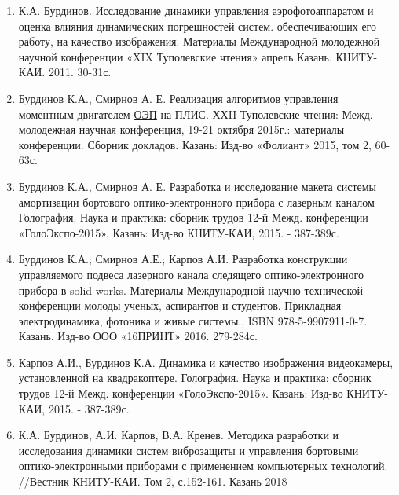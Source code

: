 \begin{enumerate}
  \item К.А. Бурдинов. Исследование динамики управления аэрофотоаппаратом и оценка влияния динамических погрешностей систем. обеспечивающих его работу, на качество изображения. Материалы Международной молодежной научной конференции «XIX Туполевские чтения» апрель Казань. КНИТУ- КАИ. 2011. 30-31с.
  \item Бурдинов К.А., Смирнов А. Е. Реализация алгоритмов управления моментным двигателем  \hyperref[acroEOS]{ОЭП} на ПЛИС. ХХII Туполевские чтения: Межд. молодежная научная конференция, 19-21 октября 2015г.: материалы конференции. Сборник докладов. Казань: Изд-во «Фолиант» 2015, том 2, 60-63с.
  \item Бурдинов К.А., Смирнов А. Е. Разработка и исследование макета системы амортизации бортового оптико-электронного прибора с лазерным каналом Голография. Наука и практика: сборник трудов 12-й Межд. конференции «ГолоЭкспо-2015». Казань: Изд-во КНИТУ-КАИ, 2015. - 387-389с.
  \item Бурдинов К.А.; Смирнов А.Е.; Карпов А.И. Разработка конструкции управляемого подвеса лазерного канала следящего оптико-электронного прибора в solid works. Материалы Международной научно-технической конференции молоды ученых, аспирантов и студентов. Прикладная электродинамика, фотоника и живые системы., ISBN 978-5-9907911-0-7. Казань. Изд-во ООО «16ПРИНТ» 2016. 279-284с.
  \item Карпов А.И., Бурдинов К.А. Динамика и качество изображения видеокамеры, установленной на квадракоптере. Голография. Наука и практика: сборник трудов 12-й Межд. конференции «ГолоЭкспо-2015». Казань: Изд-во КНИТУ-КАИ, 2015. - 387-389с.
  \item К.А. Бурдинов, А.И. Карпов, В.А. Кренев. Методика разработки и исследования динамики систем виброзащиты и управления бортовыми оптико-электронными приборами с применением компьютерных технологий. //Вестник КНИТУ-КАИ. Том 2, с.152-161. Казань 2018 
\end{enumerate}
